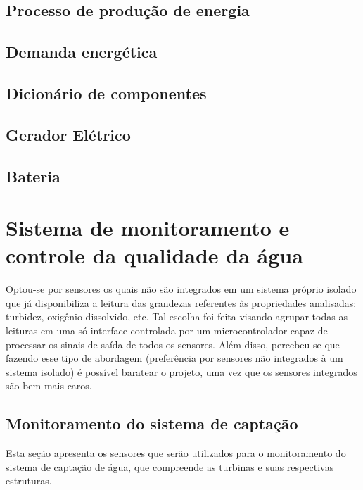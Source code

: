  	\subsection{Processo de produção de energia}
  		
  	\subsection{Demanda energética}
  		
  	\subsection{Dicionário de componentes}
  		
  	\subsection{Gerador Elétrico}
  		
  	\subsection{Bateria}
  		
  
  \vfill
  \pagebreak
  \section{Sistema de monitoramento e controle da qualidade da água}
      
      Optou-se por sensores os quais não são integrados em um sistema próprio isolado que já disponibiliza a leitura das grandezas
      referentes às propriedades analisadas: turbidez, oxigênio dissolvido, etc. Tal escolha foi feita visando agrupar todas as
      leituras em uma só interface controlada por um microcontrolador capaz de processar os sinais de saída de todos os sensores.
      Além disso, percebeu-se que fazendo esse tipo de abordagem (preferência por sensores não integrados à um sistema isolado)
      é possível baratear o projeto, uma vez que os sensores integrados são bem mais caros.
    
    \subsection{Monitoramento do sistema de captação}
      
      Esta seção apresenta os sensores que serão utilizados para o monitoramento do sistema de captação
      de água, que compreende as turbinas e suas respectivas estruturas.
      
